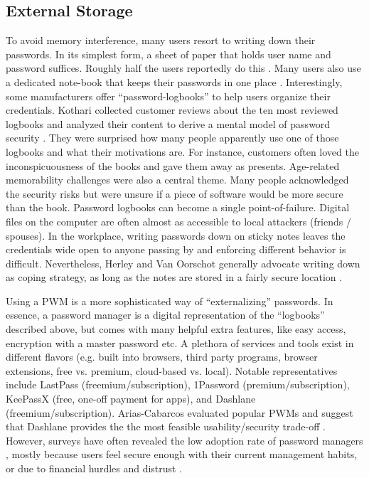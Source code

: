 	\subsection{External Storage}
	To avoid memory interference, many users resort to writing down their passwords. In its simplest form, a sheet of paper that holds user name and password suffices. Roughly half the users reportedly do this \cite{Olmstead2017AmerciansCybersecurity}. Many users also use a dedicated note-book that keeps their passwords in one place \cite{Kothari2017PasswordLogbooks}. Interestingly, some manufacturers offer ``password-logbooks'' to help users organize their credentials. Kothari \etal collected customer reviews about the ten most reviewed logbooks and analyzed their content to derive a mental model of password security \cite{Kothari2017PasswordLogbooks}. They were surprised how many people apparently use one of those logbooks and what their motivations are. For instance, customers often loved the inconspicuousness of the books and gave them away as presents. Age-related memorability challenges were also a central theme. Many people acknowledged the security risks but were unsure if a piece of software would be more secure than the book. Password logbooks can become a single point-of-failure. Digital files on the computer are often almost as accessible to local attackers (friends / spouses). In the workplace, writing passwords down on sticky notes \cite{Conklin2004PWAuthenticationSystemPerspective} leaves the credentials wide open to anyone passing by and enforcing different behavior is difficult. Nevertheless, Herley and Van Oorschot generally advocate writing down as coping strategy, as long as the notes are stored in a fairly secure location \cite{Herley2012PersistenceOfPasswords}.  

	Using a \gls{PWM} is a more sophisticated way of ``externalizing'' passwords. In essence, a password manager is a digital representation of the ``logbooks'' described above, but comes with many helpful extra features, like easy access, encryption with a master password etc. A plethora of services and tools exist in different flavors (e.g. built into browsers, third party programs, browser extensions, free vs. premium, cloud-based vs. local). Notable representatives include LastPass (freemium/subscription), 1Password (premium/subscription), KeePassX (free, one-off payment for apps), and Dashlane (freemium/subscription). Arias-Cabarcos \etal evaluated popular PWMs and suggest that Dashlane provides the the most feasible usability/security trade-off \cite{AriasCabarcos2016ComparingPWM}. However, surveys have often revealed the low adoption rate of password managers \cite{Olmstead2017AmerciansCybersecurity}, mostly because users feel secure enough with their current management habits, or due to financial hurdles and distrust \cite{CSID2012PasswordHabits}. 
	
